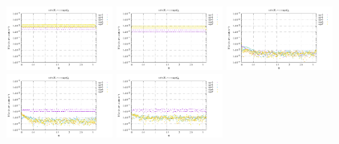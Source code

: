 \noindent
\includegraphics[width=3.5cm]{python_codes/fieldstone_152/RESULTS/exp1_2D/sr2_64_m2}
\includegraphics[width=3.5cm]{python_codes/fieldstone_152/RESULTS/exp1_2D/sr2_64_m3}
\includegraphics[width=3.5cm]{python_codes/fieldstone_152/RESULTS/exp1_2D/sr2_64_m4}
\includegraphics[width=3.5cm]{python_codes/fieldstone_152/RESULTS/exp1_2D/sr2_64_m5}
\includegraphics[width=3.5cm]{python_codes/fieldstone_152/RESULTS/exp1_2D/sr2_64_m6}

